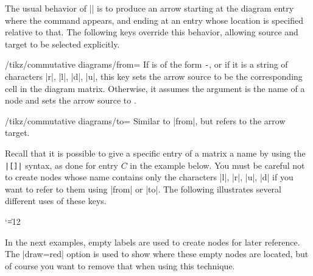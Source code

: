 \documentclass[a4paper]{ltxdoc}
\begin{document}
The usual behavior of |\arrow| is to produce an arrow starting at the
diagram entry where the command appears, and ending at an entry whose
location is specified relative to that.  The following keys override
this behavior, allowing source and target to be selected explicitly.

\begin{key}{/tikz/commutative diagrams/from=}
  If  is of the form \texttt{-}, or if it is a string of
  characters |r|, |l|, |d|, |u|, this key sets the arrow source to be
  the corresponding cell in the diagram matrix.  Otherwise, it assumes
  the argument is the name of a node and sets the arrow source to
  .
\end{key}

\begin{key}{/tikz/commutative diagrams/to=}
  Similar to |from|, but refers to the arrow target.
\end{key}

Recall that it is possible to give a specific entry of a \tikzname{}
matrix a name by using the \verb!|[!\verb!]|! syntax, as
done for entry $C$ in the example below.  You must be careful not to
create nodes whose name contains only the characters |l|, |r|, |u|,
|d| if you want to refer to them using |from| or |to|.  The following
illustrates several different uses of these keys.

{\catcode`\|=12
\begin{codeexample}[]
\end{codeexample}
}

In the next examples, empty labels are used to create nodes for later
reference.  The |draw=red| option is used to show where these empty
nodes are located, but of course you want to remove that when using
this technique.

\begin{codeexample}[]
\end{codeexample}
\end{document}
